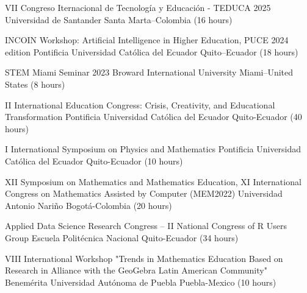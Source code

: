 \documentclass[
    a4paper,
    maincolor=cvblue!70!blue,
    sidecolor=gray!30,
    sectioncolor=cvblue!70!blue,
    sidebarwidth=7.5cm,
    topbottommargin=20pt,
    leftrightmargin=20pt,
]{fortysecondscv}
\begin{document}
    

    
    

    {VII Congreso Iternacional de Tecnología y Educación - TEDUCA 2025}
    {Universidad de Santander}
    {Santa Marta–Colombia (16 hours)}

    {INCOIN Workshop: Artificial Intelligence in Higher Education, PUCE 2024 edition}
    {Pontificia Universidad Católica del Ecuador}
    {Quito–Ecuador (18 hours)}
    
    {STEM Miami Seminar 2023}
    {Broward International University}
    {Miami–United States (8 hours)}

    {II International Education Congress: Crisis, Creativity, and Educational Transformation}
    {Pontificia Universidad Católica del Ecuador}
    {Quito-Ecuador (40 hours)}

    {I International Symposium on Physics and Mathematics}
    {Pontificia Universidad Católica del Ecuador}
    {Quito-Ecuador (10 hours)}

    {XII Symposium on Mathematics and Mathematics Education, XI International Congress on Mathematics Assisted by Computer (MEM2022)}
    {Universidad Antonio Nariño}
    {Bogotá-Colombia (20 hours)}

    {Applied Data Science Research Congress – II National Congress of R Users Group}
    {Escuela Politécnica Nacional}
    {Quito-Ecuador (34 hours)}

    {VIII International Workshop "Trends in Mathematics Education Based on Research in Alliance with the GeoGebra Latin American Community"}
    {Benemérita Universidad Autónoma de Puebla}
    {Puebla-Mexico (10 hours)}

\end{document}
